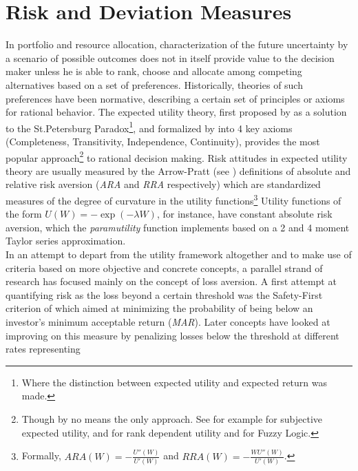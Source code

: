 \section{Risk and Deviation Measures}\label{sec:2}
In portfolio and resource allocation, characterization of the future
uncertainty  by a scenario of possible outcomes does not in itself provide
value to the decision maker unless he is able to rank, choose and allocate
among competing alternatives based on a set of preferences. Historically,
theories of such preferences have been normative, describing a certain set of
principles or axioms for rational behavior. The expected utility theory,
first proposed by  as a solution to the
St.Petersburg Paradox\footnote{Where the distinction between expected utility
and expected return was made.}, and formalized by 
into 4 key axioms (Completeness, Transitivity, Independence, Continuity),
provides the most popular approach\footnote{Though by no means the only
approach. See for example  for subjective expected
utility,  and  for rank
dependent utility and  for Fuzzy Logic.} to rational
decision making. Risk attitudes in expected utility theory are usually
measured by the Arrow-Pratt (see ) definitions of
absolute and relative risk aversion (\emph{ARA} and \emph{RRA} respectively)
which are standardized measures of the degree of curvature in the utility
functions\footnote{ Formally, $ARA\left( W \right)= - \frac{{U''\left( W
\right)}}{{U'\left( W \right)}}$ and $RRA\left( W \right)= -
\frac{{WU''\left( W \right)}}{{U'\left( W \right)}}$.} Utility functions of
the form $U\left( W \right)= - \exp \left( { - \lambda W} \right)$, for
instance, have constant absolute risk aversion, which the \emph{paramutility}
function implements based on a 2 and 4 moment Taylor series approximation.\\
In an attempt to depart from the utility framework altogether and to make
use of criteria based on more objective and concrete concepts, a parallel
strand of research has focused mainly on the concept of loss aversion. A
first attempt at quantifying risk as the loss beyond a certain threshold was
the Safety-First criterion of  which aimed at minimizing
the probability of being below an investor's minimum acceptable return
(\emph{MAR}). Later concepts have looked at improving on this measure by
penalizing losses below the threshold at different rates representing
